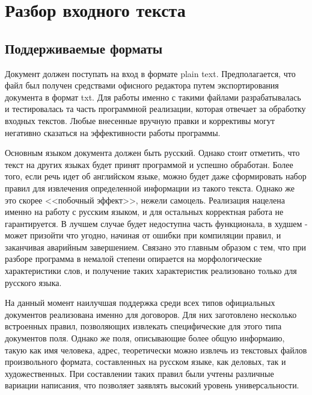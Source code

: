 \section{Разбор входного текста}
\subsection{Поддерживаемые форматы}
Документ должен поступать на вход в формате plain text. Предполагается, что файл был получен средствами офисного редактора путем экспортирования документа в формат txt. Для работы именно с такими файлами разрабатывалась и тестировалась та часть программной реализации, которая отвечает за обработку входных текстов. Любые внесенные вручную правки и коррективы могут негативно сказаться на эффективности работы программы.

Основным языком документа должен быть русский. Однако стоит отметить, что текст на других языках будет принят программой и успешно обработан. Более того, если речь идет об английском языке, можно будет даже сформировать набор правил для извлечения определенной информации из такого текста. Однако же это скорее <<побочный эффект>>, нежели самоцель. Реализация нацелена именно на работу с русским языком, и для остальных корректная работа не гарантируется. В лучшем случае будет недоступна часть функционала, в худшем - может призойти что угодно, начиная от ошибки при компиляции правил, и заканчивая аварийным завершением. Связано это главным образом с тем, что при разборе программа в немалой степени опирается на морфологические характеристики слов, и получение таких характеристик реализовано только для русского языка.

На данный момент наилучшая поддержка среди всех типов официальных документов реализована именно для договоров. Для них заготовлено несколько встроенных правил, позволяющих извлекать специфические для этого типа документов поля. Однако же поля, описывающие более общую информаию, такую как имя человека, адрес, теоретически можно извлечь из текстовых файлов произвольного формата, составленных на русском языке, как деловых, так и художественных. При составлении таких правил были учтены различные вариации написания, что позволяет заявлять высокий уровень универсальности.

